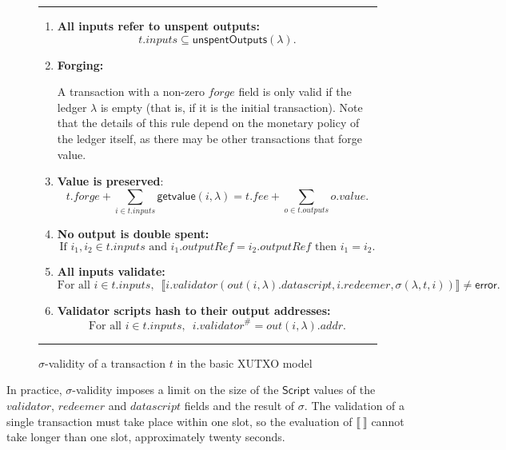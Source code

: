 \documentclass[a4paper]{article}
\theoremstyle{definition}  %
\newcommand\rfskip{7pt}
\newenvironment{ruledfigure}[1]{\begin{figure}[#1]\hrule\vspace{\rfskip}}{\vspace{\rfskip}\hrule\end{figure}}
\newcommand{\mi}[1]{\ensuremath{\mathit{#1}}}
\newcommand{\inputs}{\mi{inputs}}
\newcommand{\outputs}{\mi{outputs}}
\newcommand{\forge}{\mi{forge}}
\newcommand{\fee}{\mi{fee}}
\newcommand{\addr}{\mi{addr}}
\newcommand{\val}{\mi{value}}  %
\newcommand{\validator}{\mi{validator}}
\newcommand{\redeemer}{\mi{redeemer}}
\newcommand{\datascript}{\mi{datascript}}
\newcommand{\txout}{\mi{out}}
\newcommand{\getvalue}{\msf{getvalue}}
\newcommand{\msf}[1]{\ensuremath{\mathsf{#1}}}
\newcommand{\unspent}{\msf{unspentOutputs}}
\begin{document}
\begin{ruledfigure}{H}
\begin{enumerate}
    \item \label{all-inputs-refer-to-unspent-outputs} \textbf{All
      inputs refer to unspent outputs:}
      \[
        t.\inputs \subseteq \unspent(\lambda).
      \]
    \item\label{forging} \textbf{Forging:}
      \begin{center}
        \parbox{0.8\textwidth}{
        A transaction with a non-zero \forge{} field is only
        valid if the ledger $\lambda$ is empty
        (that is, if it is the initial
        transaction). Note that the details of this rule depend on the
        monetary policy of the ledger itself, as there may be other
        transactions that forge value.
        }
    \end{center}
      
    \item \label{value-is-preserved} \textbf{Value is preserved}:
    \[
      t.\forge + \sum_{i \in t.\inputs} \getvalue(i, \lambda) = t.\fee + \sum_{o \in t.\outputs} o.\val.
    \]
    \item \label{no-double-spending} \textbf{No output is double spent:}
    \[
     \textrm{If } i_1, i_2 \in t.\inputs \textrm{ and }  i_1.\mathit{outputRef} = i_2.\mathit{outputRef}
     \textrm{ then } i_1 = i_2.
    \]
    \item\label{all-inputs-validate} \textbf{All inputs validate:}
    \[
    \textrm{For all } i \in t.\inputs,\enspace \llbracket
    i.\validator(\txout(i, \lambda).\datascript,i.\redeemer, \sigma(\lambda, t, i)) \rrbracket \ne \textsf{error}.
      \]
    \item\label{validator-scripts-hash} \textbf{Validator scripts hash to their output addresses:}
    \[
      \textrm{For all } i \in t.\inputs,\enspace i.\validator^{\#} = \txout(i, \lambda).\addr.
    \]
\end{enumerate}
\caption{$\sigma$-validity of a transaction $t$ in the basic XUTXO model}
\label{fig:basic-xutxo-validity}
\end{ruledfigure}



\noindent In practice, $\sigma$-validity imposes a limit on the size of the
$\mathsf{Script}$ values of the $\validator$, $\redeemer$ and
$\datascript$ fields and the result of $\sigma$. The validation of a
single transaction must take place within one slot, so the evaluation
of $\llbracket ~ \rrbracket$ cannot take longer than one slot,
approximately twenty seconds.
\end{document}
